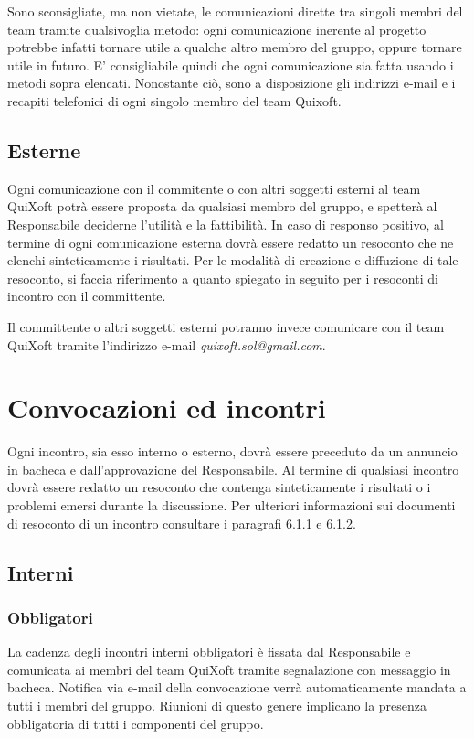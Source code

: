 \documentclass[11pt,a4paper]{article}
\begin{document}
Sono sconsigliate, ma non vietate, le comunicazioni dirette tra singoli membri del team tramite qualsivoglia metodo: ogni comunicazione inerente al progetto potrebbe infatti tornare utile a qualche altro membro del gruppo, oppure tornare utile in futuro.
E' consigliabile quindi che ogni comunicazione sia fatta usando i metodi sopra elencati.
Nonostante ciò, sono a disposizione gli indirizzi e-mail e i recapiti telefonici di ogni singolo membro del team Quixoft.
\subsection{Esterne}
Ogni comunicazione con il commitente o con altri soggetti esterni al team QuiXoft potrà essere proposta da qualsiasi membro del gruppo, e spetterà al Responsabile deciderne l'utilità e la fattibilità.
In caso di responso positivo, al termine di ogni comunicazione esterna dovrà essere redatto un resoconto che ne elenchi sinteticamente i risultati. Per le modalità di creazione e diffuzione di tale resoconto, si faccia riferimento a quanto spiegato in seguito per i resoconti di incontro con il committente.

Il committente o altri soggetti esterni potranno invece comunicare con il team QuiXoft tramite l'indirizzo e-mail \textit{quixoft.sol@gmail.com}.
\section{Convocazioni ed incontri}
Ogni incontro, sia esso interno o esterno, dovrà essere preceduto da un annuncio in bacheca e dall'approvazione del Responsabile.
Al termine di qualsiasi incontro dovrà essere redatto un resoconto che contenga sinteticamente i risultati o i problemi emersi durante la discussione.
Per ulteriori informazioni sui documenti di resoconto di un incontro consultare i paragrafi 6.1.1 e 6.1.2.
\subsection{Interni}
\subsubsection{Obbligatori}
La cadenza degli incontri interni obbligatori è fissata dal Responsabile e comunicata ai membri del team QuiXoft tramite segnalazione con messaggio in bacheca.
Notifica via e-mail della convocazione verrà automaticamente mandata a tutti i membri del gruppo.
Riunioni di questo genere implicano la presenza obbligatoria di tutti i componenti del gruppo.
\end{document}
